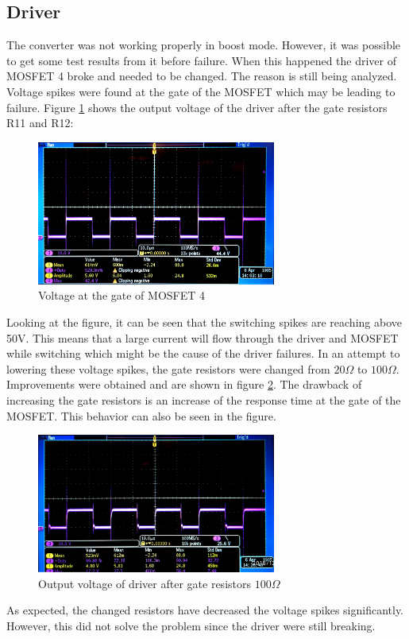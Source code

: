 \subsection{Driver}

The converter was not working properly in boost mode. However, it was possible to get some test results from it before failure. 
When this happened the driver of MOSFET 4 broke and needed to be changed. The reason is still being analyzed. 
Voltage spikes were found at the gate of the MOSFET which may be leading to failure. Figure \ref{Voltagespike} shows the output voltage of the driver after the gate resistors R11 and R12:

\begin{figure}[H]
	\begin{center}
		\includegraphics[width=0.7\textwidth]{../Pictures/P1/Discussion/Voltagespike.jpg}
		\caption{Voltage at the gate of MOSFET 4}
		\label{Voltagespike}
	\end{center}	
\end{figure}    

Looking at the figure, it can be seen that the switching spikes are reaching above 50V. This means that a large current will flow through the driver and MOSFET while switching which might be the cause of the driver failures. In an attempt to lowering these voltage spikes, the gate resistors were changed from $20\Omega$ to $100\Omega$. Improvements were obtained and are shown in figure \ref{Voltagespike_100}.
The drawback of increasing the gate resistors is an increase of the response time at the gate of the MOSFET. This behavior can also be seen in the figure.

\begin{figure}[H]
	\begin{center}
		\includegraphics[width=0.7\textwidth]{../Pictures/P1/Discussion/Voltagespike_new_resistors.jpg}
		\caption{Output voltage of driver after gate resistors $100\Omega$}
		\label{Voltagespike_100}
	\end{center}	
\end{figure} 

As expected, the changed resistors have decreased the voltage spikes significantly. However, this did not solve the problem since the driver were still breaking. 